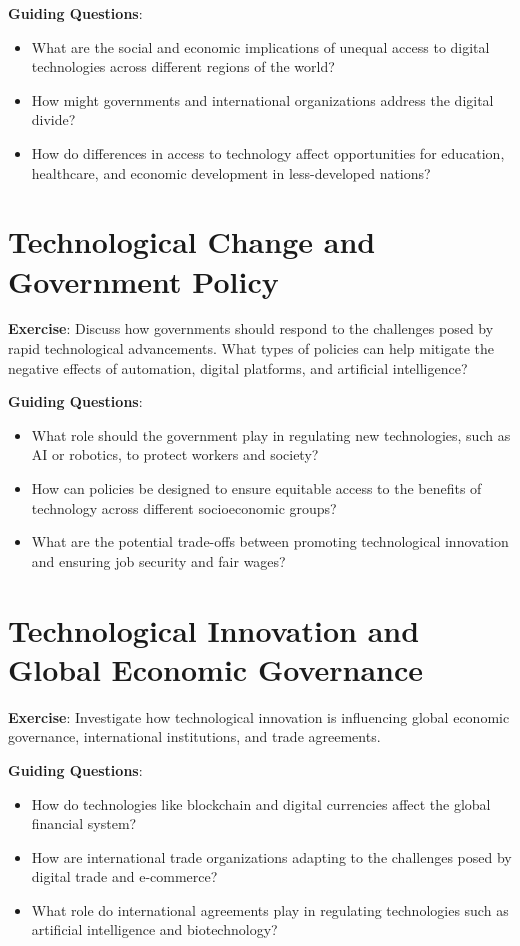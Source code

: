 \documentclass{article}
\begin{document}
\textbf{Guiding Questions}:
\begin{itemize}
    \item What are the social and economic implications of unequal access to digital technologies across different regions of the world?
    \item How might governments and international organizations address the digital divide?
    \item How do differences in access to technology affect opportunities for education, healthcare, and economic development in less-developed nations?
\end{itemize}

\section{Technological Change and Government Policy}
\textbf{Exercise}: Discuss how governments should respond to the challenges posed by rapid technological advancements. What types of policies can help mitigate the negative effects of automation, digital platforms, and artificial intelligence?

\textbf{Guiding Questions}:
\begin{itemize}
    \item What role should the government play in regulating new technologies, such as AI or robotics, to protect workers and society?
    \item How can policies be designed to ensure equitable access to the benefits of technology across different socioeconomic groups?
    \item What are the potential trade-offs between promoting technological innovation and ensuring job security and fair wages?
\end{itemize}

\section{Technological Innovation and Global Economic Governance}
\textbf{Exercise}: Investigate how technological innovation is influencing global economic governance, international institutions, and trade agreements.

\textbf{Guiding Questions}:
\begin{itemize}
    \item How do technologies like blockchain and digital currencies affect the global financial system?
    \item How are international trade organizations adapting to the challenges posed by digital trade and e-commerce?
    \item What role do international agreements play in regulating technologies such as artificial intelligence and biotechnology?
\end{itemize}
\end{document}

